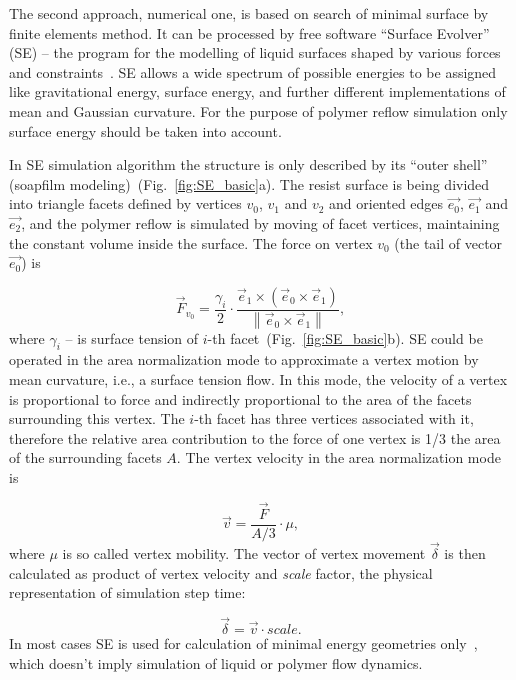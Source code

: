 The second approach, numerical one, is based on search of minimal surface by finite elements method. It can be processed by free software ``Surface Evolver'' (SE) -- the program for the modelling of liquid surfaces shaped by various forces and constraints~\cite{Brakke_SE}. SE allows a wide spectrum of possible energies to be assigned like gravitational energy, surface energy, and further different implementations of mean and Gaussian curvature. For the purpose of polymer reflow simulation only surface energy should be taken into account.

In SE simulation algorithm the structure is only described by its ``outer shell'' (soapfilm modeling)~(Fig.~\ref{fig:SE_basic}a). The resist surface is being divided into triangle facets defined by vertices $v_0$, $v_1$ and $v_2$ and oriented edges $\vec{e_0}$, $\vec{e_1}$ and $\vec{e_2}$, and the polymer reflow is simulated by moving of facet vertices, maintaining the constant volume inside the surface. The force on vertex $v_0$ (the tail of vector $\vec{e_0}$) is

\begin{equation}
	\vec{F}_{v_0}=\frac{\gamma_i}{2} \cdot \frac{\vec{e}_1 \times\left(\vec{e}_0 \times \vec{e}_1\right)}{\left\|\vec{e}_0 \times \vec{e}_1\right\|},
\end{equation}
where $\gamma_i$ -- is surface tension of $i$-th facet~(Fig.~\ref{fig:SE_basic}b). SE could be operated in the area normalization mode to approximate a vertex motion by mean curvature, i.e., a surface tension flow. In this mode, the velocity of a vertex is proportional to force and indirectly proportional to the area of the facets surrounding this vertex. The $i$-th facet has three vertices associated with it, therefore the relative area contribution to the force of one vertex is 1/3 the area of the surrounding facets $A$. The vertex velocity in the area normalization mode is

\begin{equation} \label{eq:SE_v}
	\vec{v} = \frac{\vec{F}}{A/3} \cdot \mu,
\end{equation}
where $\mu$ is so called vertex mobility. The vector of vertex movement $\vec{\delta}$ is then calculated as product of vertex velocity and \textit{scale} factor, the physical representation of simulation step time:

\begin{equation} \label{eq:SE_delta}
	\vec{\delta} = \vec{v} \cdot scale.
\end{equation}
In most cases SE is used for calculation of minimal energy geometries only~\cite{SE_example_1,SE_example_2}, which doesn't imply simulation of liquid or polymer flow dynamics.

